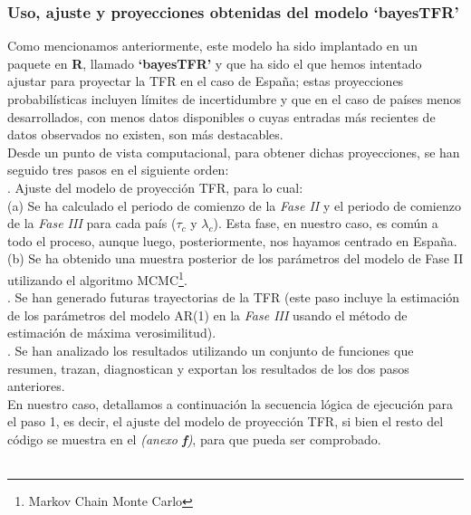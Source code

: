 \subsubsection{Uso, ajuste y proyecciones obtenidas del modelo `bayesTFR'}

Como mencionamos anteriormente, este modelo ha sido implantado en un paquete en \textsf{\textbf{R}}, llamado \textbf{`bayesTFR'} y que ha sido el que hemos intentado ajustar para proyectar la TFR en el caso de España; estas proyecciones probabilísticas incluyen límites de incertidumbre y que en el caso de países menos desarrollados, con menos datos disponibles o cuyas entradas más recientes de datos observados no existen, son más destacables.\\

Desde un punto de vista computacional, para obtener dichas proyecciones, se han seguido tres pasos en el siguiente orden:\\

. Ajuste del modelo de proyección TFR, para lo cual:\\
\indent (a) Se ha calculado el periodo de comienzo de la \textit{Fase II} y el periodo de comienzo de la \textit{Fase III} para cada país ($\tau_{c}$ y $\lambda_{c}$). Esta fase, en nuestro caso, es común a todo el proceso, aunque luego, posteriormente, nos hayamos centrado en España.\\
\indent (b) Se ha obtenido una muestra posterior de los parámetros del modelo de Fase II utilizando el algoritmo MCMC\footnote{Markov Chain Monte Carlo}.\\

. Se han generado futuras trayectorias de la TFR (este paso incluye la estimación de los parámetros del modelo AR(1) en la \textit{Fase III} usando el método de estimación de máxima verosimilitud).\\

. Se han analizado los resultados utilizando un conjunto de funciones que resumen, trazan, diagnostican y exportan los resultados de los dos pasos anteriores.\\

En nuestro caso, detallamos a continuación la secuencia lógica de ejecución para el paso 1, es decir, el ajuste del modelo de proyección TFR, si bien el resto del código se muestra en el \textit{(anexo \textbf{f})}, para que pueda ser comprobado.\\ 

{
\setlength{\fboxsep}{0.75pt}%
\noindent\setlength{\fboxrule}{0pt}%
}\\


